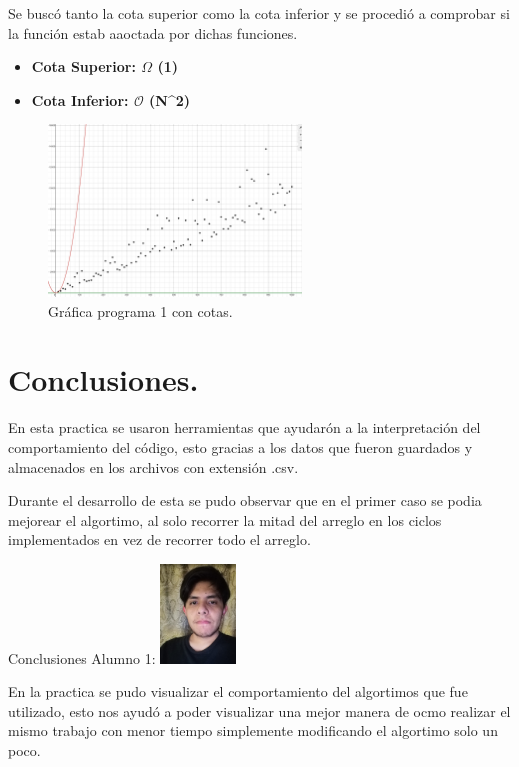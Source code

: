 \documentclass{report}
\begin{document}
	\large Se buscó tanto la cota superior como la cota inferior y se procedió a comprobar si la función estab aaoctada por dichas funciones.\par
	
	\newpage
	
	\begin{itemize}
		\item\bf Cota Superior: $\Omega$ (1) \par
		\item\bf Cota Inferior:	$\mathcal{O}$  (N^2) \par
	\end{itemize}

	\begin{figure}[h]
		\centering
		\includegraphics[width=0.6\textwidth]{5} \par
		\caption{Gráfica programa 1 con cotas.}
	\end{figure}
	
	
	
	\section* {Conclusiones.}
	\large En esta practica se usaron herramientas que ayudarón a la interpretación del comportamiento del código, esto gracias a los datos que fueron guardados y almacenados en los archivos con extensión .csv. \par
	\large Durante el desarrollo de esta se pudo observar que en el primer caso se podia mejorear el algortimo, al solo recorrer la mitad del arreglo en los ciclos implementados en vez de recorrer todo el arreglo.
	
	\begin{bf}
		Conclusiones Alumno 1: 
		\includegraphics[width=0.15\textwidth]{alumno} \par
	\end{bf}
	\large En la practica se pudo visualizar el comportamiento del algortimos que fue utilizado, esto nos ayudó a poder visualizar una mejor manera de ocmo realizar el mismo trabajo con menor tiempo simplemente modificando el algortimo solo un poco. \par
	
	
	
	
\end{document}
